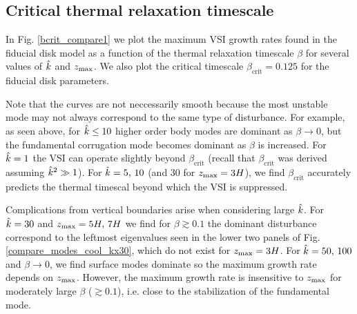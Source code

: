 


\subsection{Critical thermal relaxation
  timescale}\label{bcrit_num_test}
In Fig. \ref{bcrit_compare1} we plot the maximum VSI growth rates
found in the fiducial disk model as a function of the thermal
relaxation timescale $\beta$ for several values of $\hat{k}$ and
$z_\mathrm{max}$. We also plot the critical timescale
$\beta_\mathrm{crit}=0.125$ for the fiducial disk parameters.   

Note that the curves are not neccessarily smooth because the most unstable
mode may not always correspond to the same type of disturbance. For example,
as seen above, for $\hat{k} \leq 10$ higher order body modes are
dominant as $\beta\to 0$, but the fundamental corrugation
mode becomes dominant as $\beta$ is increased. For $\hat{k}=1$ the VSI
can operate slightly beyond $\beta_\mathrm{crit}$  (recall that
$\beta_\mathrm{crit}$ was derived assuming $\hat{k}^2\gg 1$). For
$\hat{k}=5,\,10$ (and $30$ for $z_\mathrm{max}=3H$), we find
$\beta_\mathrm{crit}$ accurately predicts the thermal timescal beyond
which the VSI is suppressed.   

Complications from vertical boundaries arise when considering large
$\hat{k}$. For $\hat{k}=30$ and $z_\mathrm{max}=5H,\,7H$ we find for $\beta\gtrsim
0.1$ the dominant disturbance correspond to the leftmost eigenvalues 
seen in the lower two panels of Fig. \ref{compare_modes_cool_kx30},
which do not exist for $z_\mathrm{max}=3H$. For $\hat{k}=50,\,100$ and
$\beta\to0$, we find surface modes dominate so the maximum growth rate
depends on $z_\mathrm{max}$. However, the maximum growth rate is insensitive to
$z_\mathrm{max}$ for moderately large $\beta$ ($\gtrsim 0.1$), i.e. close to
the stabilization of the fundamental mode. 


